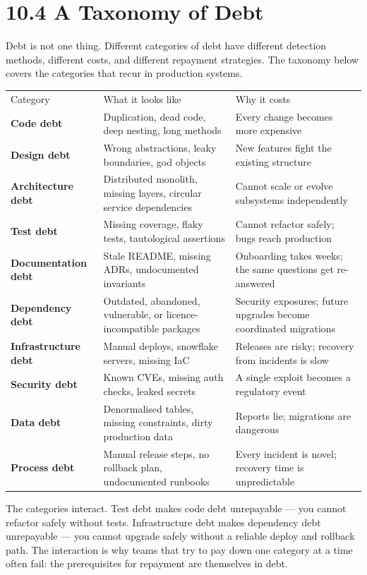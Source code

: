 \documentclass[11pt,a4paper]{book}
\begin{document}
\medskip

\section{10.4 A Taxonomy of Debt}

Debt is not one thing. Different categories of debt have different detection methods, different costs, and different repayment strategies. The taxonomy below covers the categories that recur in production systems.

\begin{tabular}{lll}
\hline
Category & What it looks like & Why it costs \\
\textbf{Code debt} & Duplication, dead code, deep nesting, long methods & Every change becomes more expensive \\
\textbf{Design debt} & Wrong abstractions, leaky boundaries, god objects & New features fight the existing structure \\
\textbf{Architecture debt} & Distributed monolith, missing layers, circular service dependencies & Cannot scale or evolve subsystems independently \\
\textbf{Test debt} & Missing coverage, flaky tests, tautological assertions & Cannot refactor safely; bugs reach production \\
\textbf{Documentation debt} & Stale README, missing ADRs, undocumented invariants & Onboarding takes weeks; the same questions get re-answered \\
\textbf{Dependency debt} & Outdated, abandoned, vulnerable, or licence-incompatible packages & Security exposures; future upgrades become coordinated migrations \\
\textbf{Infrastructure debt} & Manual deploys, snowflake servers, missing IaC & Releases are risky; recovery from incidents is slow \\
\textbf{Security debt} & Known CVEs, missing auth checks, leaked secrets & A single exploit becomes a regulatory event \\
\textbf{Data debt} & Denormalised tables, missing constraints, dirty production data & Reports lie; migrations are dangerous \\
\textbf{Process debt} & Manual release steps, no rollback plan, undocumented runbooks & Every incident is novel; recovery time is unpredictable \\
\hline
\end{tabular}

The categories interact. Test debt makes code debt unrepayable --- you cannot refactor safely without tests. Infrastructure debt makes dependency debt unrepayable --- you cannot upgrade safely without a reliable deploy and rollback path. The interaction is why teams that try to pay down one category at a time often fail: the prerequisites for repayment are themselves in debt.
\end{document}
